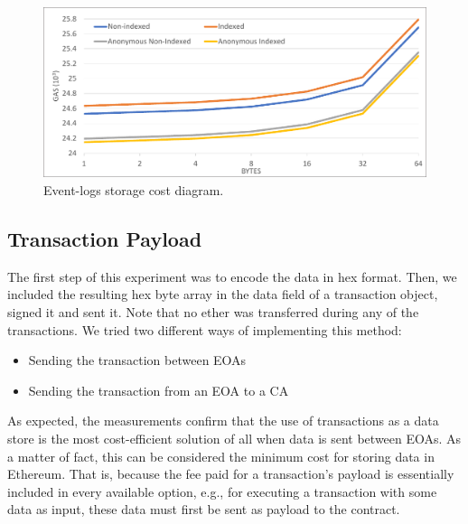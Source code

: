 
\begin{figure}[htbp]
\centerline{\includegraphics[width=\textwidth]{figs/logs_1.pdf}}
\caption{Event-logs storage cost diagram.}
\label{fig:logs}
\end{figure}

\subsection{Transaction Payload}\label{subsection:evaluation_payload}
The first step of this experiment was to encode the data in hex format. Then, we included the resulting hex byte array in the data field of a transaction object, signed it and sent it. Note that no ether was transferred during any of the transactions. We tried two different ways of implementing this method:

\begin{itemize}[topsep=0pt, itemsep=0pt]
  \item Sending the transaction between EOAs
  \item Sending the transaction from an EOA to a CA
\end{itemize}

As expected, the measurements confirm that the use of transactions as a data store is the most cost-efficient solution of all when data is sent between EOAs. As a matter of fact, this can be considered the minimum cost for storing data in Ethereum. That is, because the fee paid for a transaction’s payload is essentially included in every available option, e.g., for executing a transaction with some data as input, these data must first be sent as payload to the contract.

